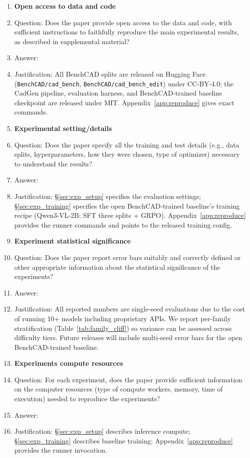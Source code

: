 \begin{enumerate}
\item {\bf Open access to data and code}
    \item[] Question: Does the paper provide open access to the data and code, with sufficient instructions to faithfully reproduce the main experimental results, as described in supplemental material?
    \item[] Answer: \answerYes{}
    \item[] Justification: All BenchCAD splits are released on Hugging Face (\texttt{BenchCAD/cad\_bench}, \texttt{BenchCAD/cad\_bench\_edit}) under CC-BY-4.0; the CadGen pipeline, evaluation harness, and BenchCAD-trained baseline checkpoint are released under MIT. Appendix~\ref{app:reproduce} gives exact commands.


\item {\bf Experimental setting/details}
    \item[] Question: Does the paper specify all the training and test details (e.g., data splits, hyperparameters, how they were chosen, type of optimizer) necessary to understand the results?
    \item[] Answer: \answerYes{}
    \item[] Justification: \S\ref{sec:exp_setup} specifies the evaluation settings; \S\ref{sec:exp_training} specifies the open BenchCAD-trained baseline's training recipe (Qwen3-VL-2B; SFT three splits + GRPO). Appendix~\ref{app:reproduce} provides the runner commands and points to the released training config.

\item {\bf Experiment statistical significance}
    \item[] Question: Does the paper report error bars suitably and correctly defined or other appropriate information about the statistical significance of the experiments?
    \item[] Answer: \answerNo{}
    \item[] Justification: All reported numbers are single-seed evaluations due to the cost of running 10+ models including proprietary APIs. We report per-family stratification (Table~\ref{tab:family_cliff}) so variance can be assessed across difficulty tiers. Future releases will include multi-seed error bars for the open BenchCAD-trained baseline.

\item {\bf Experiments compute resources}
    \item[] Question: For each experiment, does the paper provide sufficient information on the computer resources (type of compute workers, memory, time of execution) needed to reproduce the experiments?
    \item[] Answer: \answerYes{}
    \item[] Justification: \S\ref{sec:exp_setup} describes inference compute; \S\ref{sec:exp_training} describes baseline training; Appendix~\ref{app:reproduce} provides the runner invocation.


\end{enumerate}
